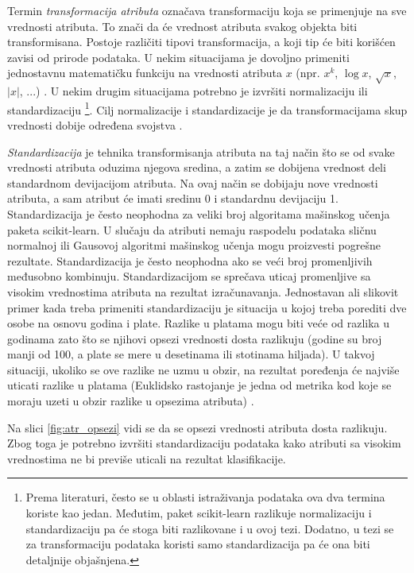 \documentclass[12pt,oneside]{memoir}
\begin{document}
Termin \textit{transformacija atributa} označava transformaciju koja se primenjuje na sve vrednosti atributa. To znači da će vrednost atributa svakog objekta biti transformisana. Postoje različiti tipovi transformacija, a koji tip će biti korišćen zavisi od prirode podataka. U nekim situacijama je dovoljno primeniti jednostavnu matematičku funkciju na vrednosti atributa $x$ (npr. $x^k$, $\log x$, $\sqrt{x}$, $\left| x \right|$, ...) . U nekim drugim situacijama potrebno je izvršiti normalizaciju ili standardizaciju \footnote{Prema literaturi, često se u oblasti istraživanja podataka ova dva termina koriste kao jedan. Međutim, paket scikit-learn razlikuje normalizaciju i standardizaciju pa će stoga biti razlikovane i u ovoj tezi. Dodatno, u tezi se za transformaciju podataka koristi samo standardizacija pa će ona biti detaljnije objašnjena.}. Cilj normalizacije i standardizacije je da transformacijama skup vrednosti dobije određena svojstva \cite{mitic}.  


\textit{Standardizacija} je tehnika transformisanja atributa na taj način što se od svake vrednosti atributa oduzima njegova sredina, a zatim se dobijena vrednost deli standardnom devijacijom atributa. Na ovaj način se dobijaju nove vrednosti atributa, a sam atribut će imati sredinu 0 i standardnu devijaciju 1. 
Standardizacija je često neophodna za veliki broj algoritama mašinskog učenja paketa scikit-learn. U slučaju da atributi nemaju raspodelu podataka sličnu normalnoj ili Gausovoj algoritmi mašinskog učenja mogu proizvesti pogrešne rezultate. 
Standardizacija je često neophodna ako se veći broj promenljivih međusobno kombinuju. Standardizacijom se sprečava uticaj promenljive sa visokim vrednostima atributa na rezultat izračunavanja. Jednostavan ali slikovit primer kada treba primeniti standardizaciju je situacija u kojoj treba porediti dve osobe na osnovu godina i plate. Razlike u platama mogu biti veće od razlika u godinama zato što se njihovi opsezi vrednosti dosta razlikuju (godine su broj manji od 100, a plate se mere u desetinama ili stotinama hiljada). U takvoj situaciji, ukoliko se ove razlike ne uzmu u obzir, na rezultat poređenja će najviše uticati razlike u platama (Euklidsko rastojanje je jedna od metrika kod koje se moraju uzeti u obzir razlike u opsezima atributa) \cite{ sklearn_preprocessing, mlm2, mitic}. 

Na slici \ref{fig:atr_opsezi} vidi se da se opsezi vrednosti atributa dosta razlikuju. Zbog toga je potrebno izvršiti standardizaciju podataka kako atributi sa visokim vrednostima ne bi previše uticali na rezultat klasifikacije. 
\end{document}
